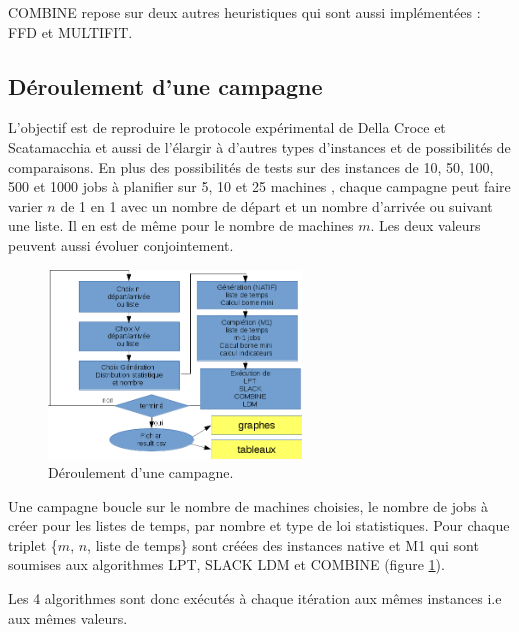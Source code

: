 \documentclass[a4paper,12pt]{report}
\theoremstyle{plain}				%
\theoremstyle{definition}				%
\newcommand\dcs{Della Croce et Scatamacchia\xspace}
\begin{document}
COMBINE repose sur deux autres heuristiques qui sont aussi implémentées : FFD et MULTIFIT.



\subsection{Déroulement d'une campagne} \label{ssec:campagnesDeroullementDUneCampagne}
L'objectif est de reproduire le protocole expérimental de \dcs et aussi de l'élargir 
  à d'autres types d'instances et de possibilités de comparaisons.
En plus des possibilités de tests sur des instances de 10, 50, 100, 500 et 1000 jobs à planifier 
  sur 5, 10 et 25 machines \cite{della2020longest}, 
  chaque campagne peut faire varier $n$ de 1 en 1 avec 
  un nombre de départ et un nombre d'arrivée 
  ou suivant une liste. 
Il en est de même pour le nombre de machines $m$. 
Les deux valeurs peuvent aussi évoluer conjointement.

\begin{figure}
{\centering
\includegraphics[height=50mm]{derouleCampagne.png}
\caption{Déroulement d'une campagne.}
\label{fig:deroulementDUneCampagne}
\par}
\end{figure}

Une campagne boucle sur le nombre de machines choisies, le nombre de jobs à créer pour les listes de temps, par nombre et type de loi statistiques. Pour chaque triplet \{$m$, $n$, liste de temps\} sont créées des instances native et M1 qui sont soumises aux algorithmes LPT, SLACK LDM et COMBINE 
 (figure \ref{fig:deroulementDUneCampagne}).

Les 4 algorithmes sont donc exécutés à chaque itération aux mêmes instances i.e aux mêmes valeurs. 
\end{document}

